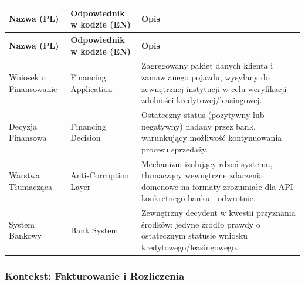\begin{longtable}{|p{4cm}|p{4cm}|p{8cm}|}
\hline
\textbf{Nazwa (PL)} & \textbf{Odpowiednik w kodzie (EN)} & \textbf{Opis} \\
\hline
\endfirsthead

\hline
\textbf{Nazwa (PL)} & \textbf{Odpowiednik w kodzie (EN)} & \textbf{Opis} \\
\hline
\endhead

Wniosek o Finansowanie & Financing Application & Zagregowany pakiet danych klienta i zamawianego pojazdu, wysyłany do zewnętrznej instytucji w celu weryfikacji zdolności kredytowej/leasingowej. \\
\hline

Decyzja Finansowa & Financing Decision & Ostateczny status (pozytywny lub negatywny) nadany przez bank, warunkujący możliwość kontynuowania procesu sprzedaży. \\
\hline

Warstwa Tłumacząca & Anti-Corruption Layer & Mechanizm izolujący rdzeń systemu, tłumaczący wewnętrzne zdarzenia domenowe na formaty zrozumiałe dla API konkretnego banku i odwrotnie. \\
\hline

System Bankowy & Bank System & Zewnętrzny decydent w kwestii przyznania środków; jedyne źródło prawdy o ostatecznym statusie wniosku kredytowego/leasingowego. \\
\hline
\end{longtable}

\subsubsection{Kontekst: Fakturowanie i Rozliczenia}


